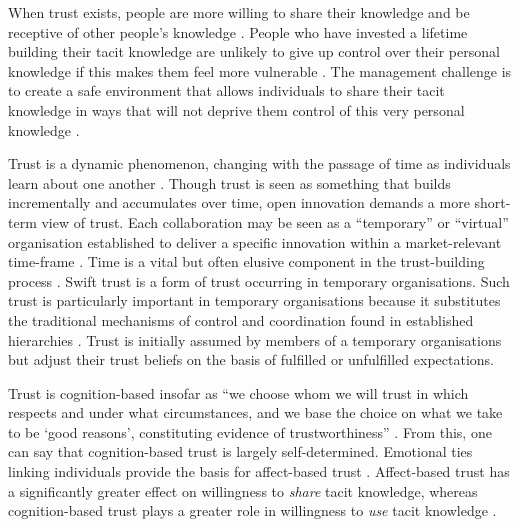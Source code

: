 When trust exists, people are more willing to share their knowledge and be receptive of other people's knowledge \citep{levin2004strength}. People who have invested a lifetime building their tacit knowledge are unlikely to give up control over their personal knowledge if this makes them feel more vulnerable \citep{leonard1998role,lin2007share}. The management challenge is to create a safe environment that allows individuals to share their tacit knowledge in ways that will not deprive them control of this very personal knowledge \citep{bordum2002tacit}. \medskip

Trust is a dynamic phenomenon, changing with the passage of time as individuals learn about one another \citep{blomqvist1997many,panteli2005trust}. Though trust is seen as something that builds incrementally and accumulates over time, open innovation demands a more short-term view of trust. Each collaboration may be seen as a \enquote{temporary} or \enquote{virtual} organisation established to deliver a specific innovation within a market-relevant time-frame \citep{cococcioni2014exploring}. Time is a vital but often elusive component in the trust-building process \citep{kasper2001communicating}. Swift trust is a form of trust occurring in temporary organisations. Such trust is particularly important in temporary organisations because it substitutes the traditional mechanisms of control and coordination found in established hierarchies \citep{kasper2001communicating}. Trust is initially assumed by members of a temporary organisations but adjust their trust beliefs on the basis of fulfilled or unfulfilled expectations.


Trust is cognition-based insofar as \enquote{we choose whom we will trust in which respects and under what circumstances, and we base the choice on what we take to be \enquote{good reasons}, constituting evidence of trustworthiness} \citep{lewis1985trust}. From this, one can say that cognition-based trust is largely self-determined. Emotional ties linking individuals provide the basis for affect-based trust \citep{mcallister1995affect}. Affect-based trust has a significantly greater effect on willingness to \emph{share} tacit knowledge, whereas cognition-based trust plays a greater role in willingness to \emph{use} tacit knowledge \citep{levin2004strength,holste2010trust}. \medskip

